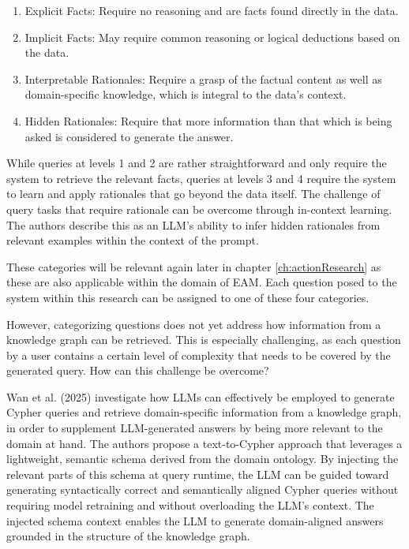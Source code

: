 \begin{enumerate}[label=Level \arabic*, leftmargin=*]
	\item Explicit Facts: Require no reasoning and are facts found directly in the data.
	\item Implicit Facts: May require common reasoning or logical deductions based on the data.
	\item Interpretable Rationales: Require a grasp of the factual content as well as domain-specific knowledge, which is integral to the data's context.
	\item Hidden Rationales: Require that more information than that which is being asked is considered to generate the answer.
\end{enumerate}

While queries at levels 1 and 2 are rather straightforward and only require the system to retrieve the relevant facts, queries at levels 3 and 4 require the system to learn and apply rationales that go beyond the data itself. The challenge of query tasks that require rationale can be overcome through in-context learning. The authors describe this as an LLM's ability to infer hidden rationales from relevant examples within the context of the prompt. \cite{zhao2024retrieval}

These categories will be relevant again later in chapter \ref{ch:actionResearch} as these are also applicable within the domain of EAM. Each question posed to the system within this research can be assigned to one of these four categories.

However, categorizing questions does not yet address how information from a knowledge graph can be retrieved. This is especially challenging, as each question by a user contains a certain level of complexity that needs to be covered by the generated query. How can this challenge be overcome?




Wan et al. (2025) \cite{wan2025prompting} investigate how LLMs can effectively be employed to generate Cypher queries and retrieve domain-specific information from a knowledge graph, in order to supplement LLM-generated answers by being more relevant to the domain at hand. The authors propose a text-to-Cypher approach that leverages a lightweight, semantic schema derived from the domain ontology. By injecting the relevant parts of this schema at query runtime, the LLM can be guided toward generating syntactically correct and semantically aligned Cypher queries without requiring model retraining and without overloading the LLM's context. The injected schema context enables the LLM to generate domain-aligned answers grounded in the structure of the knowledge graph.

